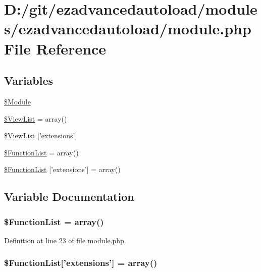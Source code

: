 \hypertarget{module_8php}{\section{\-D\-:/git/ezadvancedautoload/modules/ezadvancedautoload/module.php \-File \-Reference}
\label{module_8php}
}
\subsection*{\-Variables}
\begin{DoxyCompactItemize}
\item 
\hyperlink{module_8php_a643d60fb839b5d58f0725a88d0ecd1a0}{\$\-Module}
\item 
\hyperlink{module_8php_a8e0c26fc38651904852a8f967a548fa2}{\$\-View\-List} = array()
\item 
\hyperlink{module_8php_a0cfec2359ce3a2faffb2a415c2bcbd21}{\$\-View\-List} \mbox{[}'extensions'\mbox{]}
\item 
\hyperlink{module_8php_a81d0c7ad3471ab93425a3cdf655a9c95}{\$\-Function\-List} = array()
\item 
\hyperlink{module_8php_a4ebda8699e3f12057fdaf4e8639a45f8}{\$\-Function\-List} \mbox{[}'extensions'\mbox{]} = array()
\end{DoxyCompactItemize}


\subsection{\-Variable \-Documentation}
\hypertarget{module_8php_a81d0c7ad3471ab93425a3cdf655a9c95}{
\subsubsection[{\$\-Function\-List}]{\setlength{\rightskip}{0pt plus 5cm}\$\-Function\-List = array()}}\label{module_8php_a81d0c7ad3471ab93425a3cdf655a9c95}


\-Definition at line 23 of file module.\-php.

\hypertarget{module_8php_a4ebda8699e3f12057fdaf4e8639a45f8}{
\subsubsection[{\$\-Function\-List}]{\setlength{\rightskip}{0pt plus 5cm}\$\-Function\-List\mbox{[}'extensions'\mbox{]} = array()}}\label{module_8php_a4ebda8699e3f12057fdaf4e8639a45f8}


